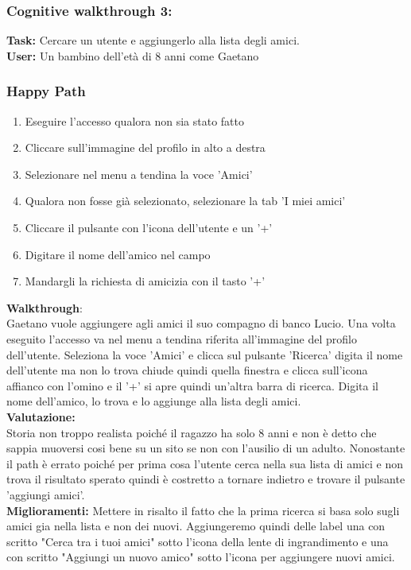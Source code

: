\documentclass[../Report.tex]{subfiles}
\begin{document}
    \subsubsection{Cognitive walkthrough 3:}
    \textbf{Task:} Cercare un utente e aggiungerlo alla lista degli amici.\\
    \textbf{User:} Un bambino dell'età di 8 anni come Gaetano
    \subsubsection{Happy Path}
    \begin{enumerate}
        \item Eseguire l'accesso qualora non sia stato fatto 
        \item Cliccare sull'immagine del profilo in alto a destra
        \item Selezionare nel menu a tendina la voce 'Amici'
        \item Qualora non fosse già selezionato, selezionare la tab 'I miei amici'
        \item Cliccare il pulsante con l'icona dell'utente e un '+'
        \item Digitare il nome dell'amico nel campo
        \item Mandargli la richiesta di amicizia con il tasto '+'
    \end{enumerate}
    \textbf{Walkthrough}:\\
    Gaetano vuole aggiungere agli amici il suo compagno di banco Lucio. Una volta eseguito l'accesso va nel menu a tendina riferita all'immagine del profilo dell'utente.
    Seleziona la voce 'Amici' e clicca sul pulsante 'Ricerca' digita il nome dell'utente ma non lo trova chiude quindi quella finestra e clicca sull'icona affianco con l'omino e il '+' si apre quindi un'altra barra di ricerca.
    Digita il nome dell'amico, lo trova e lo aggiunge alla lista degli amici.\\

    \textbf{Valutazione:}\\Storia non troppo realista poiché il ragazzo ha solo 8 anni e non è detto che sappia muoversi cosi bene su un sito se non con l'ausilio di un adulto.
    Nonostante il path è errato poiché per prima cosa l'utente cerca nella sua lista di amici e non trova il risultato sperato quindi è costretto a tornare indietro e trovare il pulsante 'aggiungi amici'.\\

    \textbf{Miglioramenti:} Mettere in risalto il fatto che la prima ricerca si basa solo sugli amici gia nella lista e non dei nuovi. Aggiungeremo quindi delle label una con scritto "Cerca tra i tuoi amici" sotto l'icona della lente di ingrandimento e una con scritto "Aggiungi un nuovo amico" sotto l'icona per aggiungere nuovi amici. 
\end{document}
